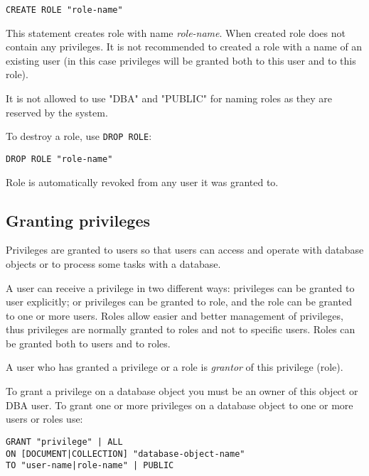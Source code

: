 \documentclass[a4paper,12pt]{article}
\begin{document}
\begin{verbatim}
CREATE ROLE "role-name"
\end{verbatim}

This statement creates role with name \emph{role-name}. When created role does
not contain any privileges. It is not recommended to created a role with a name
of an existing user (in this case privileges will be granted both to this user
and to this role).

It is not allowed to use "DBA" and "PUBLIC" for naming roles as they are
reserved by the system.

To destroy a role, use \verb!DROP ROLE!:

\begin{verbatim}
DROP ROLE "role-name"
\end{verbatim}

Role is automatically revoked from any user it was granted to.


\subsection{Granting privileges}

Privileges are granted to users so that users can access and operate with
database objects or to process some tasks with a database.

A user can receive a privilege in two different ways: privileges can be granted
to user explicitly; or privileges can be granted to role, and the role can be
granted to one or more users. Roles allow easier and better management of
privileges, thus privileges are normally granted to roles and not to specific
users. Roles can be granted both to users and to roles.

A user who has granted a privilege or a role is \emph{grantor} of this privilege
(role).

To grant a privilege on a database object you must be an owner of this object or
DBA user. To grant one or more privileges on a database object to one or more
users or roles use:

\begin{verbatim}
GRANT "privilege" | ALL
ON [DOCUMENT|COLLECTION] "database-object-name"
TO "user-name|role-name" | PUBLIC
\end{verbatim}
\end{document}
